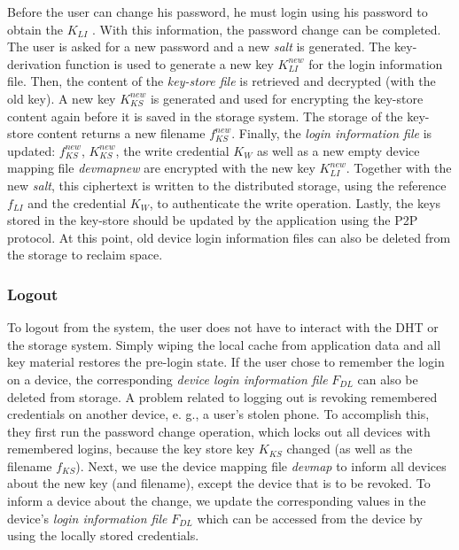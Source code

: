 Before the user can change his password, he must login using his password to
obtain the $K_{LI}$ . With this information, the password change can be
completed. The user is asked for a new password and a new \textit{salt} is
generated. The key-derivation function is used to generate a new key
$K_{LI}^{new}$
for the login information file. Then, the content of the \textit{key-store
file} is
retrieved and decrypted (with the old key). A new key $K_{KS}^{new}$ is generated and
used for encrypting the key-store content again before it is saved in the
storage system. The storage of the key-store content returns a new filename $f_{KS}^{new}$.
Finally, the \textit{login information file}
is updated: $f_{KS}^{new}$, $K_{KS}^{new}$, the write credential $K_{W}$ as well as a new empty
device mapping file \textit{devmapnew} are encrypted with the new key $K_{LI}^{new}$.
  Together with the new \textit{salt}, this ciphertext is written to the distributed
storage, using the reference $f_{LI}$ and the credential $K_W$, to authenticate the
write operation. Lastly, the keys stored in the key-store should be updated by
the application using the P2P protocol.  At this point, old device login
information files can also be deleted from the
storage to reclaim space.

\subsubsection{Logout}

To logout from the system, the user does not have to interact
with the DHT or the storage system. Simply wiping the local
cache from application data and all key material restores the
pre-login state. If the user chose to remember the login on a
device, the corresponding \textit{device login information file} $F_{DL}$
can also be deleted from storage.
 A problem related to logging out is revoking remembered
credentials on another device, e. g., a user’s stolen phone. To
accomplish this, they first run the password change operation,
which locks out all devices with remembered logins, because
the key store key $K_{KS}$ changed (as well as the filename $f_{KS}$).
Next, we use the device mapping file \textit{devmap} to inform all devices
about the new key (and filename), except the device that is to
be revoked. To inform a device about the change, we update
the corresponding values in the device’s \textit{login information file}
 $F_{DL}$ which can be accessed from the device by using the
locally stored credentials.


